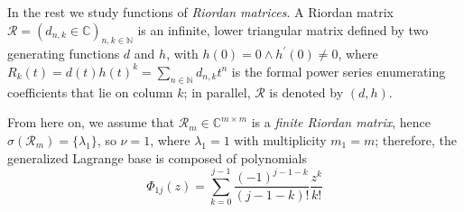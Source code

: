 In the rest we study functions of \emph{Riordan matrices}. A Riordan matrix
$\mathcal{R}=(d_{n,k}\in\mathbb{C})_{n,k\in\mathbb{N}}$ is an infinite, lower
triangular matrix defined by two generating functions $d$ and $h$, with $h(0)=0
\wedge h^{\prime}(0)\neq0$, where $R_{k}(t) = d(t)h(t)^{k} =
\sum_{n\in\mathbb{N}}{d_{n,k}t^{n}}$ is the formal power series enumerating
coefficients that lie on column $k$; in parallel, $\mathcal{R}$ is denoted by $(d,
h)$. 

From here on, we assume that $\mathcal{R}_{m}\in\mathbb{C}^{m\times m}$ is a
\emph{finite Riordan matrix}, hence $\sigma(\mathcal{R}_{m})= \lbrace
\lambda_{1} \rbrace$, so $\nu=1$, where $\lambda_{1}=1$ with multiplicity
$m_{1}=m$;  therefore, the generalized Lagrange base is composed of polynomials
\begin{displaymath}
  \Phi_{1j}(z) = \sum_{k=0}^{j-1}{\frac{(-1)^{j-1-k}}{(j-1-k)!}\frac{z^{k}}{k!}}
\end{displaymath}

